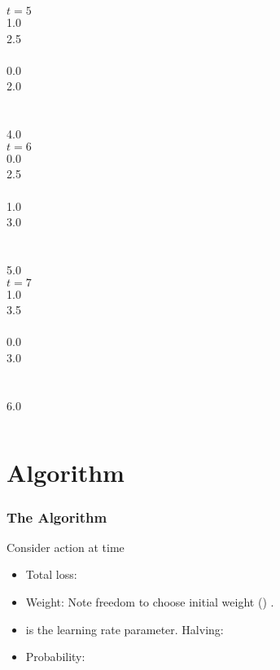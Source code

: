 \documentclass[handout]{beamer}
\begin{document}
\begin{frame}
\begin{columns}
\column[t]{1cm}
 $t=5$ \\ 1.0 \\ 2.5 \\~\\ 0.0 \\ 2.0 \\~\\~\\4.0\\
		    			     
\column[t]{1cm}	   		   
 $t=6$   \\ 0.0 \\ 2.5 \\~\\ 1.0  \\ 3.0 \\~\\~\\5.0\\

\column[t]{1cm}
 $t=7$ \\ 1.0 \\ 3.5 \\~\\ 0.0 \\ 3.0 \\~\\~\\6.0\\
		    			     

\end{columns} 
\end{frame}


\section{\ouralg Algorithm}

\begin{frame}
\frametitle{The \ouralg Algorithm}
Consider action  at time 
\begin{itemize}
\item Total loss:
\item Weight:
Note freedom to choose initial weight ()
.
\item
{} is the learning rate parameter. Halving: \R{$\eta \to \infty$}
\item Probability:
\end{itemize}
\end{frame}
\end{document}
